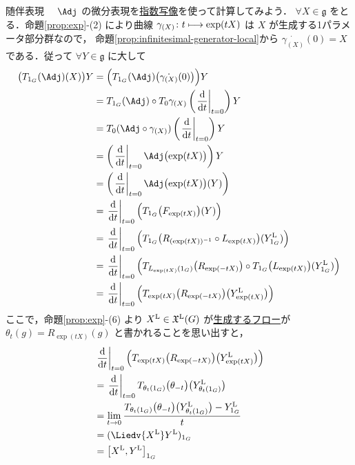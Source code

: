 \documentclass[TQFT_main]{subfiles}
\begin{document}
\begin{myexample}[label=def:Lie-adj]{随伴表現}
    　$\Adj$ の微分表現を\hyperref[def:exp]{指数写像}を使って計算してみよう．
    $\forall X \in \mathfrak{g}$ をとる．命題\ref{prop:exp}-(2) により曲線 $\gamma_{(X)} \colon t \longmapsto \exp(tX)$ は $X$ が生成する1パラメータ部分群なので，
    命題\ref{prop:infinitesimal-generator-local}から $\dot{\gamma_{(X)}}(0) = X$ である．従って $\forall Y \in \mathfrak{g}$ に大して
    \begin{align}
        \bigl(T_{1_G}(\Adj) (X)\bigr)Y 
        &= \Bigl( T_{1_G} (\Adj)\bigl(\dot{\gamma_{(X)}}(0)\bigr) \Bigr) Y \\
        &= T_{1_G} (\Adj) \circ T_0 \gamma_{(X)} \left( \eval{\dv{}{t}}_{t=0} \right)  Y \\
        &= T_{0} (\Adj \circ \gamma_{(X)}) \left( \eval{\dv{}{t}}_{t=0}  \right) Y \\
        &= \left(\eval{\dv{}{t}}_{t=0} \Adj \bigl(\exp (tX)\bigr) \right) Y \\
        &= \left(\eval{\dv{}{t}}_{t=0} \Adj \bigl(\exp (tX)\bigr)(Y) \right) \\
        &= \eval{\dv{}{t}}_{t=0} \Bigl(T_{1_G}\bigl( F_{\exp (tX)}  \bigr)(Y) \Bigr) \\
        &= \eval{\dv{}{t}}_{t=0} \Bigl(T_{1_G}\bigl( R_{(\exp (tX))^{-1}} \circ L_{\exp (tX)} \bigr)(\Lie{Y}_{1_G}) \Bigr)\\
        &= \eval{\dv{}{t}}_{t=0} \Bigl(T_{L_{\exp (tX)}(1_G)}\bigl( R_{\exp (-tX)} \bigr) \circ T_{1_G} \bigl( L_{\exp (tX)} \bigr)(\Lie{Y}_{1_G}) \Bigr)\\
        &= \eval{\dv{}{t}}_{t=0} \Bigl(T_{\exp (tX)}\bigl( R_{\exp (-tX)} \bigr) \bigl(\Lie{Y}_{\exp (tX)}\bigr) \Bigr)
    \end{align}
    ここで，命題\ref{prop:exp}-(6) より $X^{\mathrm{L}} \in \mathfrak{X}^{\mathrm{L}}(G)$ が\hyperref[thm:fundamental-flow]{生成するフロー}が $\theta_t (g) = R_{\exp(tX)} (g)$ と書かれることを思い出すと，
    \begin{align}
        &\eval{\dv{}{t}}_{t=0} \Bigl(T_{\exp (tX)}\bigl( R_{\exp (-tX)} \bigr) \bigl(\Lie{Y}_{\exp (tX)}\bigr) \Bigr) \\
        &= \eval{\dv{}{t}}_{t=0} T_{\theta_t(1_G)} \bigl(\theta_{-t}\bigr) \bigl( \Lie{Y}_{\theta_t (1_G)} \bigr) \\
        &= \lim_{t \to 0} \frac{T_{\theta_t(1_G)} \bigl(\theta_{-t}\bigr) \bigl( \Lie{Y}_{\theta_t (1_G)} \bigr) - \Lie{Y}_{1_G}}{t} \\
        &= (\Liedv{\Lie{X}} \Lie{Y})_{1_G} \\
        &= \comm{\Lie{X}}{\Lie{Y}}_{1_G} \\

\end{align}
\end{myexample}
\end{document}

